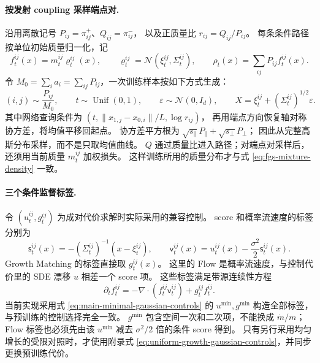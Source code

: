 \documentclass[UTF8,a4paper,11pt,fontset=fandol]{ctexart}
\begin{document}
\paragraph{按发射 coupling 采样端点对.}
沿用离散记号 $P_{ij}=\pi^+_{ij}$、$Q_{ij}=\pi^-_{ij}$，
以及正质量比 $r_{ij}=Q_{ij}/P_{ij}$。
每条条件路径按单位初始质量归一化，记
\begin{equation}
f_t^{ij}(x)=m_t^{ij}\varrho_t^{ij}(x),\qquad
\varrho_t^{ij}=\mathcal N(\xi_t^{ij},\Sigma_t^{ij}),\qquad
\rho_t(x)=\sum_{ij}P_{ij}f_t^{ij}(x).
\label{eq:fgs-mixture-density}
\end{equation}
令 $M_0=\sum_i a_i=\sum_{ij}P_{ij}$，一次训练样本按如下方式生成：
\begin{equation}
(i,j)\sim\frac{P_{ij}}{M_0},\qquad
t\sim\operatorname{Unif}(0,1),\qquad
\varepsilon\sim\mathcal N(0,I_d),\qquad
X=\xi_t^{ij}+(\Sigma_t^{ij})^{1/2}\varepsilon.
\label{eq:fgs-sampling}
\end{equation}
其中网络查询条件为 $(t,\|x_{1,j}-x_{0,i}\|/L,\log r_{ij})$，
再用端点方向恢复轴对称协方差，将均值平移回起点。
协方差平方根为 $\sqrt{s_\parallel}P_\parallel+\sqrt{s_\perp}P_\perp$；
因此从完整高斯分布采样，而不是只取均值曲线。
$Q$ 通过质量比进入路径；对端点对采样后，还须用当前质量 $m_t^{ij}$ 加权损失。
这样训练所用的质量分布才与式 \eqref{eq:fgs-mixture-density} 一致。

\paragraph{三个条件监督标签.}
令 $(u_t^{ij},g_t^{ij})$ 为成对代价求解时实际采用的兼容控制。
score 和概率流速度的标签分别为
\begin{equation}
\mathsf s_t^{ij}(x)
=-(\Sigma_t^{ij})^{-1}(x-\xi_t^{ij}),\qquad
\mathsf v_t^{ij}(x)
=u_t^{ij}(x)-\frac{\sigma^2}{2}\mathsf s_t^{ij}(x).
\label{eq:fgs-conditional-targets}
\end{equation}
Growth Matching 的标签直接取 $g_t^{ij}(x)$。
这里的 Flow 是概率流速度，与控制代价里的 SDE 漂移 $u$ 相差一个 score 项。
这些标签满足带源连续性方程
\begin{equation}
\partial_tf_t^{ij}
=-\nabla\cdot(f_t^{ij}\mathsf v_t^{ij})+g_t^{ij}f_t^{ij}.
\end{equation}
当前实现采用式 \eqref{eq:main-minimal-gaussian-controls} 的
$u^{\min},g^{\min}$ 构造全部标签，与预训练的控制选择完全一致。
$g^{\min}$ 包含空间一次和二次项，不能换成 $\dot m/m$；
Flow 标签也必须先由该 $u^{\min}$ 减去 $\sigma^2/2$ 倍的条件 score 得到。
只有另行采用均匀增长的受限对照时，才使用附录式
\eqref{eq:uniform-growth-gaussian-controls}，并同步更换预训练代价。
\end{document}
